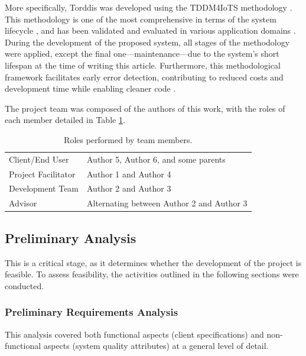		More specifically, Torddis was developed using the TDDM4IoTS methodology \citep{Guerrero-Ulloa2020TDDM4IoTS}. This methodology is one of the most comprehensive in terms of the system lifecycle \citep{Guerrero2023Agile}, and has been validated and evaluated in various application domains  \citep{Guerrero-Ulloa2020IoT, Guerrero-Ulloa2022Internet, Guerrero-Ulloa2023DevIdeAir, Guerrero-Ulloa2023SP4, Guerrero-Ulloa2023Nawi}. During the development of the proposed system, all stages of the methodology were applied, except the final one—maintenance—due to the system’s short lifespan at the time of writing this article. Furthermore, this methodological framework facilitates early error detection, contributing to reduced costs and development time while enabling cleaner code \citep{Beck2002TDD}.
		
		The project team was composed of the authors of this work, with the roles of each member detailed in Table \ref{tab:Roles}.
		
		\begin{table}[!htbp]
			\caption{Roles performed by team members.\label{tab:Roles}}
			\centering
			\begin{tabularx}{0.8\textwidth}{>{\raggedright\arraybackslash}X >{\raggedright\arraybackslash}X}
				\toprule
				\multicolumn{1}{c}{\textbf{Role}} & \multicolumn{1}{c}{\textbf{Member}} \\
				\midrule
				Client/End User & Author 5, Author 6, and some parents\\
				Project Facilitator & Author 1 and Author 4\\
				Development Team & Author 2 and Author 3\\
				Advisor & Alternating between Author 2 and Author 3\\
				\bottomrule
			\end{tabularx}
		\end{table}
		
		\subsection{Preliminary Analysis}
			This is a critical stage, as it determines whether the development of the project is feasible. To assess feasibility, the activities outlined in the following sections were conducted.
			
			\subsubsection{Preliminary Requirements Analysis}
				This analysis covered both functional aspects (client specifications) and non-functional aspects (system quality attributes) at a general level of detail.
				

